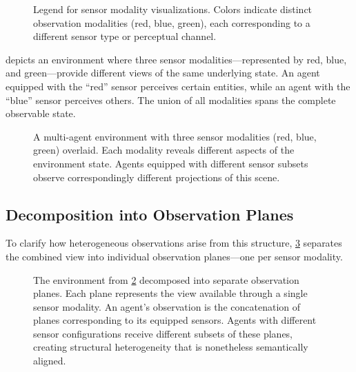 \begin{figure}[ht]
    \centering
    
    \caption[Sensor Modality Legend]{
        Legend for sensor modality visualizations. Colors indicate 
        distinct observation modalities (red, blue, green), each 
        corresponding to a different sensor type or perceptual channel.
    }
    \label{fig:modality_legend}
\end{figure}

 depicts an environment where three 
sensor modalities—represented by red, blue, and green—provide 
different views of the same underlying state. An agent equipped 
with the ``red'' sensor perceives certain entities, while an 
agent with the ``blue'' sensor perceives others. The union of 
all modalities spans the complete observable state.

\begin{figure}[ht]
    \centering
    
    \caption[Environment with Multiple Sensor Modalities]{
        A multi-agent environment with three sensor modalities 
        (red, blue, green) overlaid. Each modality reveals 
        different aspects of the environment state. Agents 
        equipped with different sensor subsets observe 
        correspondingly different projections of this scene.
    }
    \label{fig:env_modalities}
\end{figure}

\subsection{Decomposition into Observation Planes}

To clarify how heterogeneous observations arise from this structure, 
\cref{fig:modality_planes} separates the combined view into 
individual observation planes—one per sensor modality.

\begin{figure}[ht]
    \centering
    
    \caption[Decomposed Observation Planes]{
        The environment from \cref{fig:env_modalities} decomposed 
        into separate observation planes. Each plane represents 
        the view available through a single sensor modality. 
        An agent's observation is the concatenation of planes 
        corresponding to its equipped sensors. Agents with 
        different sensor configurations receive different 
        subsets of these planes, creating structural heterogeneity 
        that is nonetheless semantically aligned.
    }
    \label{fig:modality_planes}
\end{figure}

